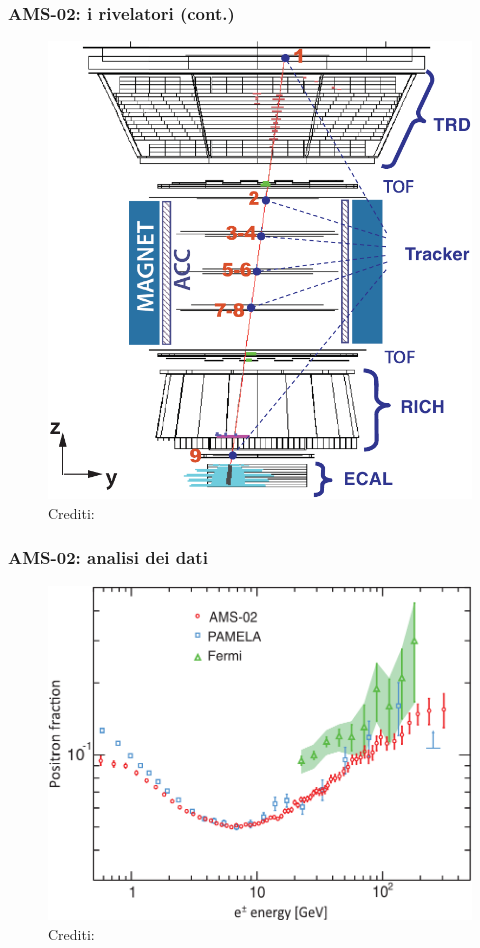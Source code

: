 \documentclass[10pt]{beamer}
\begin{document}
\begin{frame}
  \frametitle{AMS-02: i rivelatori (cont.)}
  \begin{figure}
    \centering
    \includegraphics[width=.5\columnwidth]{ams-rivelatori2}
    \caption{Crediti: \textcite{2013PhRvL.110n1102A}}
  \end{figure}
\end{frame}


\begin{frame}
  \frametitle{AMS-02: analisi dei dati}
  \begin{figure}
    \centering
    \includegraphics[width=.74\columnwidth]{ams1}
    \caption{Crediti: \textcite{2013PhRvL.110n1102A}}
  \end{figure}
\end{frame}
\end{document}

